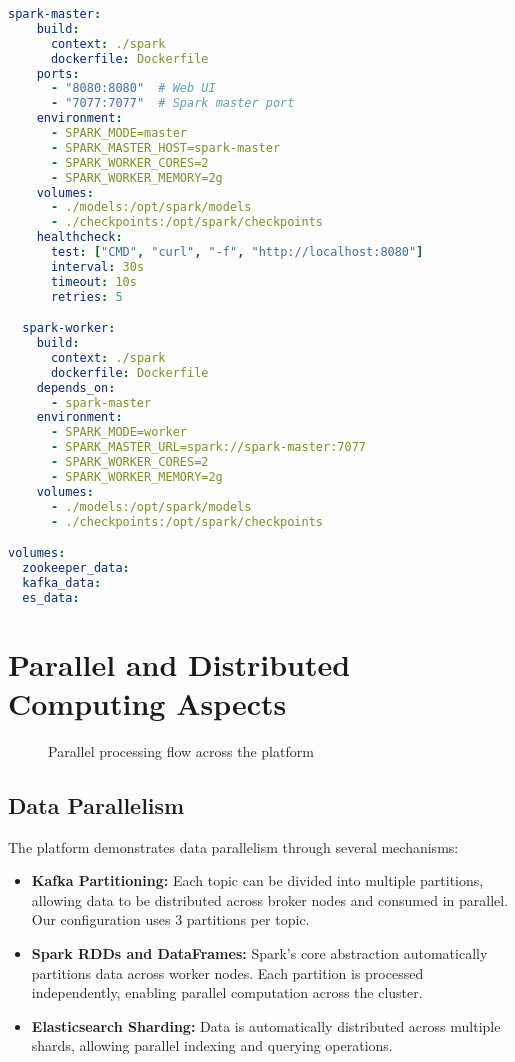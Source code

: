 \documentclass[11pt, a4paper]{article}
\newenvironment{customcode}[1]{
  \begin{tcolorbox}[
    enhanced,
    colback=codebg,
    colframe=codeframe,
    arc=0pt,
    outer arc=0pt,
    boxrule=1pt,
    left=10pt,
    right=10pt,
    top=10pt,
    bottom=10pt,
    title={#1},
    fonttitle=\sffamily\bfseries\color{mainblue},
    coltitle=white,
    colbacktitle=secondaryblue,
    attach boxed title to top left={xshift=10pt, yshift=-\tcboxedtitleheight/2},
    boxed title style={
      sharp corners,
      boxrule=0pt,
    },
  ]
}{
  \end{tcolorbox}
}
\begin{document}
\begin{customcode}{Docker Compose Configuration (YAML)}
\begin{lstlisting}[language=yaml]
  spark-master:
    build: 
      context: ./spark
      dockerfile: Dockerfile
    ports:
      - "8080:8080"  # Web UI
      - "7077:7077"  # Spark master port
    environment:
      - SPARK_MODE=master
      - SPARK_MASTER_HOST=spark-master
      - SPARK_WORKER_CORES=2
      - SPARK_WORKER_MEMORY=2g
    volumes:
      - ./models:/opt/spark/models
      - ./checkpoints:/opt/spark/checkpoints
    healthcheck:
      test: ["CMD", "curl", "-f", "http://localhost:8080"]
      interval: 30s
      timeout: 10s
      retries: 5

  spark-worker:
    build:
      context: ./spark
      dockerfile: Dockerfile
    depends_on:
      - spark-master
    environment:
      - SPARK_MODE=worker
      - SPARK_MASTER_URL=spark://spark-master:7077
      - SPARK_WORKER_CORES=2
      - SPARK_WORKER_MEMORY=2g
    volumes:
      - ./models:/opt/spark/models
      - ./checkpoints:/opt/spark/checkpoints

volumes:
  zookeeper_data:
  kafka_data:
  es_data:
\end{lstlisting}
\end{customcode}

\clearpage
\section{Parallel and Distributed Computing Aspects}

\begin{figure}[h]
  \centering
  \caption{Parallel processing flow across the platform}
  \label{fig:parallel}
\end{figure}

\subsection{Data Parallelism}
The platform demonstrates data parallelism through several mechanisms:

\begin{itemize}[leftmargin=*]
  \item \textbf{Kafka Partitioning:} Each topic can be divided into multiple partitions, allowing data to be distributed across broker nodes and consumed in parallel. Our configuration uses 3 partitions per topic.
  
  \item \textbf{Spark RDDs and DataFrames:} Spark's core abstraction automatically partitions data across worker nodes. Each partition is processed independently, enabling parallel computation across the cluster.
  
  \item \textbf{Elasticsearch Sharding:} Data is automatically distributed across multiple shards, allowing parallel indexing and querying operations.
\end{itemize}
\end{document}

